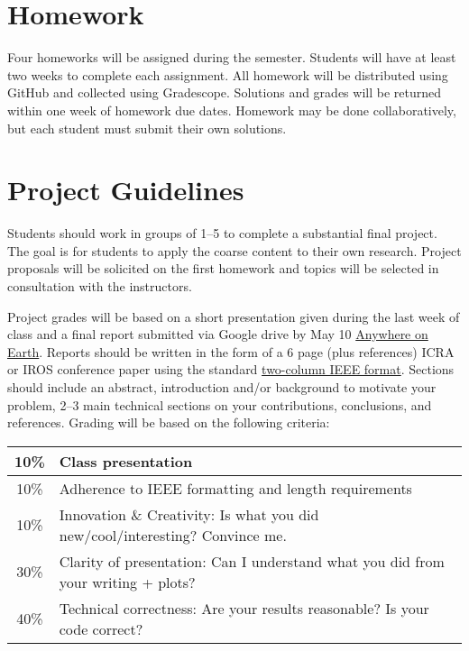 \documentclass[11pt,letterpaper]{article}
\begin{document}
\section*{Homework}

Four homeworks will be assigned during the semester. Students will have at least two weeks to complete each assignment. All homework will be distributed using GitHub and collected using Gradescope. Solutions and grades will be returned within one week of homework due dates. Homework may be done collaboratively, but each student must submit their own solutions.


\section*{Project Guidelines}

Students should work in groups of 1--5 to complete a substantial final project. The goal is for students to apply the coarse content to their own research. Project proposals will be solicited on the first homework and topics will be selected in consultation with the instructors.

\medskip
\noindent
Project grades will be based on a short presentation given during the last week of class and a final report submitted via Google drive by May 10 \href{https://time.is/Anywhere_on_Earth}{Anywhere on Earth}. Reports should be written in the form of a 6 page (plus references) ICRA or IROS conference paper using the standard \href{https://www.ieee.org/conferences/publishing/templates.html}{two-column IEEE format}. Sections should include an abstract, introduction and/or background to motivate your problem, 2--3 main technical sections on your contributions, conclusions, and references. Grading will be based on the following criteria:
\newline
\newline
\begin{tabular}{|c|l|}
\hline
10\% & Class presentation \\
\hline
10\% & Adherence to IEEE formatting and length requirements \\
\hline
10\% & Innovation \& Creativity: Is what you did new/cool/interesting? Convince me. \\
\hline
30\% & Clarity of presentation: Can I understand what you did from your writing + plots? \\
\hline
40\% & Technical correctness: Are your results reasonable? Is your code correct? \\
\hline	
\end{tabular}
\end{document}
